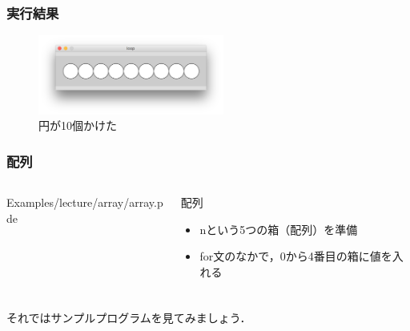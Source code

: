 \documentclass[10pt, dvipdfmx]{beamer}
\begin{document}
        \begin{frame}
            \frametitle{実行結果}
                \begin{figure}[htb]
                    \includegraphics[width=61mm]{images/12.png}
                    \caption{円が10個かけた}
                    \label{fig:12}
                \end{figure}
        \end{frame}

        \begin{frame}
            \frametitle{配列}
            \begin{columns}[c]
                \begin{column}{0.50\textwidth}
                    \tiny
                    Examples/lecture/array/array.pde
                    \scriptsize
                \end{column}
                \begin{column}{0.50\textwidth}
                    \begin{block}{配列}
                        \begin{itemize}
                            \item nという5つの箱（配列）を準備
                            \item for文のなかで，0から4番目の箱に値を入れる
                        \end{itemize}
                    \end{block}
                \end{column}
            \end{columns}
        \end{frame}

        \begin{frame}
            \frametitle{}
            \centering
            \large
            それではサンプルプログラムを見てみましょう．
        \end{frame}
\end{document}
